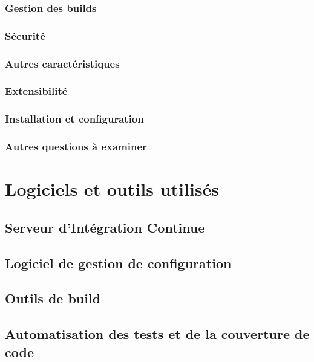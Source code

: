 \documentclass{report}
\begin{document}
          \subsubsection{Gestion des builds}

          \subsubsection{Sécurité}

          \subsubsection{Autres caractéristiques}

          \subsubsection{Extensibilité}

          \subsubsection{Installation et configuration}

          \subsubsection{Autres questions à examiner}

      \section{Logiciels et outils utilisés}

        \subsection{Serveur d’Intégration Continue}

        \subsection{Logiciel de gestion de configuration}

        \subsection{Outils de build}

        \subsection{Automatisation des tests et de la couverture de code}
\end{document}
